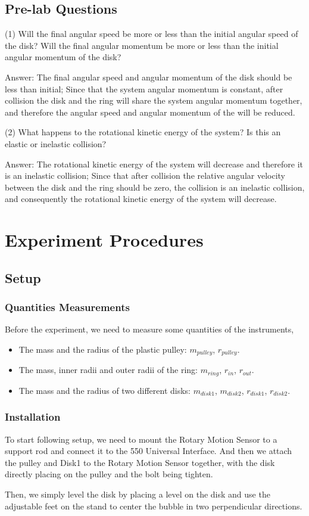 \documentclass[12pt]{article}
\begin{document}
	\subsection{Pre-lab Questions}
	(1) Will the final angular speed be more or less than the initial angular speed of the disk? Will the final angular momentum be more or less than the initial angular momentum of the disk?\par
	Answer: The final angular speed and angular momentum of the disk should be less than initial; Since that the system angular momentum is constant, after collision the disk and the ring will share the system angular momentum together, and therefore the angular speed and angular momentum of the will be reduced.\par 
	(2) What happens to the rotational kinetic energy of the system? Is this an elastic or inelastic collision?\par 
	Answer: The rotational kinetic energy of the system will decrease and therefore it is an inelastic collision; Since that after collision the relative angular velocity between the disk and the ring should be zero, the collision is an inelastic collision, and consequently the rotational kinetic energy of the system will decrease. 
	
	\section{Experiment Procedures}
	\subsection{Setup}
	\subsubsection{Quantities Measurements}
	Before the experiment, we need to measure some quantities of the instruments,
	\begin{itemize}
		\item The mass and the radius of the plastic pulley:  $m_{pulley}$, $r_{pulley}$.
		\item The mass, inner radii and outer radii of the ring: $m_{ring}$, $r_{in}$, $r_{out}$.
		\item The mass and the radius of two different disks: $m_{disk1}$, $m_{disk2}$, $r_{disk1}$, $r_{disk2}$.
	\end{itemize} 
	\subsubsection{Installation}
	To start following setup, we need to mount the Rotary Motion Sensor to a support rod and connect it to the 550 Universal Interface. And then we attach the pulley and Disk1 to the Rotary Motion Sensor together, with the disk directly placing on the pulley and the bolt being tighten. \par 
	Then, we simply level the disk by placing a level on the disk and use the adjustable feet on the stand to center the bubble in two perpendicular directions. 
\end{document}
